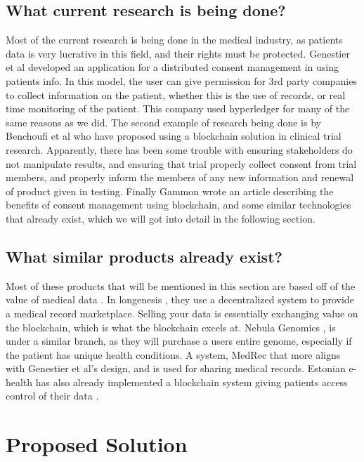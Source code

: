\documentclass[11pt,journal]{IEEEtran}
\begin{document}
\subsection{What current research is being done?}
Most of the current research is being done in the medical industry, as patients data is very lucrative in this field, and their rights must be protected.  Genestier et al \cite{genestier2017blockchain} developed an application for a distributed consent management in using patients info.  In this model, the user can give permission for 3rd party companies to collect information on the patient, whether this is the use of records, or real time monitoring of the patient.  This company used hyperledger for many of the same reasons as we did.  The second example of research being done is by Benchoufi et al \cite{benchoufi2017blockchain}\cite{benchoufi2017blockchain2} who have proposed using a blockchain solution in clinical trial research.  Apparently, there has been some trouble with ensuring stakeholders do not manipulate results, and ensuring that trial properly collect consent from trial members, and properly inform the members of any new information and renewal of product given in testing.  Finally Gammon \cite{gammon2018experimenting} wrote an article describing the benefits of consent management using blockchain, and some similar technologies that already exist, which we will got into detail in the following section. 

\subsection{What similar products already exist?}
Most of these products that will be mentioned in this section are based off of the value of medical data \cite{gammon2018experimenting}.  In longenesis \cite{Longenes50:online}, they use a decentralized system to provide a medical record marketplace.  Selling your data is essentially exchanging value on the blockchain, which is what the blockchain excels at.  Nebula Genomics \cite{Howitwor19:online}, is under a similar branch, as they will purchase a users entire genome, especially if the patient has unique health conditions.  A system, MedRec \cite{MedRec35:online} that more aligns with Genestier et al’s \cite{genestier2017blockchain} design, and is used for sharing medical records.  Estonian e-health has also already implemented a blockchain system giving patients access control of their data \cite{gammon2018experimenting}.


\section{Proposed Solution} \label{sec:solution}
\end{document}
